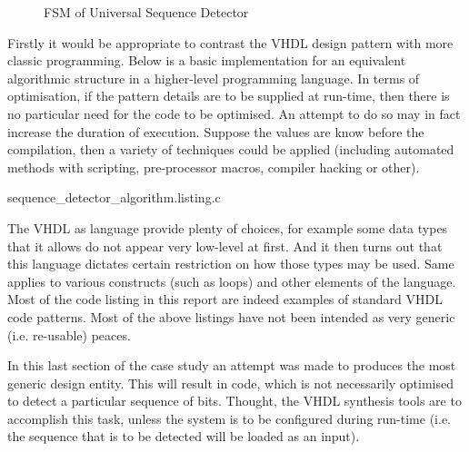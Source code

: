 \documentclass[10pt,a4paper]{report}
\begin{document}
 \begin{figure}
 \caption{FSM of Universal Sequence Detector} \label{fsm:usd}
 \vspace*{0.5cm}
 \end{figure}


 Firstly it would be appropriate to contrast the
 VHDL design pattern with more classic programming.
 Below is a basic implementation for an equivalent
 algorithmic structure in a higher-level programming
 language. In terms of optimisation, if the pattern
 details are to be supplied at run-time, then there
 is no particular need for the code to be optimised.
 An attempt to do so may in fact increase the duration
 of execution. Suppose the values are know before the
 compilation, then a variety of techniques could be
 applied (including automated methods with scripting,
 pre-processor macros, compiler hacking or other).



{sequence_detector_algorithm.listing.c}

 The VHDL as language provide plenty of choices,
 for example some data types that it allows do
 not appear very low-level at first. And it then
 turns out that this language dictates certain
 restriction on how those types may be used.
 Same applies to various constructs (such as loops)
 and other elements of the language. Most of the
 code listing in this report are indeed examples
 of standard VHDL code patterns. Most of the above
 listings have not been intended as very generic 
 (i.e. re-usable) peaces.

 In this last section of the case study an attempt
 was made to produces the most generic design entity.
 This will result in code, which is not necessarily
 optimised to detect a particular sequence of bits.
 Thought, the VHDL synthesis tools are to accomplish
 this task, unless the system is to be configured
 during run-time (i.e. the sequence that is to be
 detected will be loaded as an input).
\end{document}
